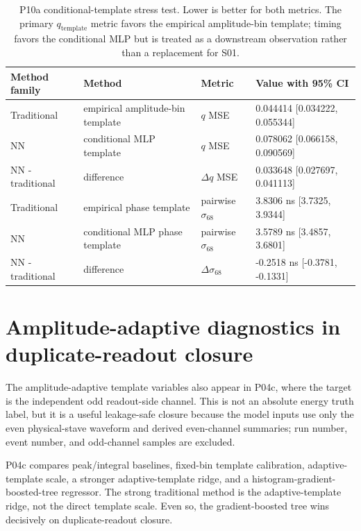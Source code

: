 \begin{table}[H]
  \centering
  \small
  \caption{P10a conditional-template stress test.  Lower is better for both
  metrics.  The primary \(q_{\mathrm{template}}\) metric favors the empirical
  amplitude-bin template; timing favors the conditional MLP but is treated as a
  downstream observation rather than a replacement for S01.}
  \label{tab:p10a-template-benchmark}
  \begin{tabular}{p{}p{}p{}p{}}
    \toprule
    Method family & Method & Metric & Value with 95\% CI \\
    \midrule
    Traditional & empirical amplitude-bin template & \(q\) MSE & 0.044414 [0.034222, 0.055344] \\
    NN & conditional MLP template & \(q\) MSE & 0.078062 [0.066158, 0.090569] \\
    NN - traditional & difference & \(\Delta q\) MSE & 0.033648 [0.027697, 0.041113] \\
    Traditional & empirical phase template & pairwise \(\sigma_{68}\) & 3.8306 ns [3.7325, 3.9344] \\
    NN & conditional MLP phase template & pairwise \(\sigma_{68}\) & 3.5789 ns [3.4857, 3.6801] \\
    NN - traditional & difference & \(\Delta\sigma_{68}\) & -0.2518 ns [-0.3781, -0.1331] \\
    \bottomrule
  \end{tabular}
\end{table}

\section{Amplitude-adaptive diagnostics in duplicate-readout closure}
\label{sec:p04c-closure}

The amplitude-adaptive template variables also appear in P04c, where the target
is the independent odd readout-side channel.  This is not an absolute energy
truth label, but it is a useful leakage-safe closure because the model inputs
use only the even physical-stave waveform and derived even-channel summaries;
run number, event number, and odd-channel samples are excluded.

P04c compares peak/integral baselines, fixed-bin template calibration,
adaptive-template scale, a stronger adaptive-template ridge, and a
histogram-gradient-boosted-tree regressor.  The strong traditional method is
the adaptive-template ridge, not the direct template scale.  Even so, the
gradient-boosted tree wins decisively on duplicate-readout closure.

